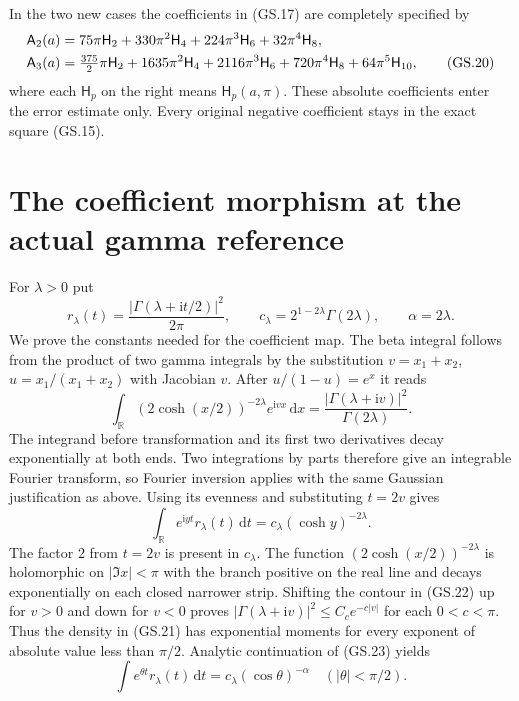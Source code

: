 \documentclass[11pt]{article}
\newcommand{\ii}{\mathrm i}
\newcommand{\dd}{\,\mathrm d}
\begin{document}
In the two new cases the coefficients in (GS.17) are completely
specified by
\begin{align}
 \mathsf A_2(a)
 &=75\pi\mathsf H_2+330\pi^2\mathsf H_4
   +224\pi^3\mathsf H_6+32\pi^4\mathsf H_8,\notag\\
 \mathsf A_3(a)
 &=\tfrac{375}{2}\pi\mathsf H_2+1635\pi^2\mathsf H_4
   +2116\pi^3\mathsf H_6+720\pi^4\mathsf H_8
   +64\pi^5\mathsf H_{10},\tag{GS.20}
\end{align}
where each $\mathsf H_p$ on the right means $\mathsf H_p(a,\pi)$.
These absolute coefficients enter the error estimate only. Every
original negative coefficient stays in the exact square (GS.15).

\section{The coefficient morphism at the actual gamma reference}

For $\lambda>0$ put
\begin{equation}
 r_\lambda(t)=\frac{|\Gamma(\lambda+\ii t/2)|^2}{2\pi},\qquad
 c_\lambda=2^{1-2\lambda}\Gamma(2\lambda),\qquad
 \alpha=2\lambda.\tag{GS.21}
\end{equation}
We prove the constants needed for the coefficient map. The beta
integral follows from the product of two gamma integrals by the
substitution $v=x_1+x_2$, $u=x_1/(x_1+x_2)$ with Jacobian $v$.
After $u/(1-u)=e^x$ it reads
\begin{equation}
 \int_{\mathbb R}(2\cosh(x/2))^{-2\lambda}e^{\ii vx}\dd x
 =\frac{|\Gamma(\lambda+\ii v)|^2}{\Gamma(2\lambda)}.
 \tag{GS.22}
\end{equation}
The integrand before transformation and its first two derivatives
decay exponentially at both ends. Two integrations by parts therefore
give an integrable Fourier transform, so Fourier inversion applies
with the same Gaussian justification as above. Using its evenness
and substituting $t=2v$ gives
\begin{equation}
 \int_{\mathbb R}e^{\ii yt}r_\lambda(t)\dd t
 =c_\lambda(\cosh y)^{-2\lambda}.\tag{GS.23}
\end{equation}
The factor $2$ from $t=2v$ is present in $c_\lambda$.
The function $(2\cosh(x/2))^{-2\lambda}$ is holomorphic on
$|\Im x|<\pi$ with the branch positive on the real line and
decays exponentially on each closed narrower strip. Shifting the
contour in (GS.22) up for $v>0$ and down for $v<0$ proves
$|\Gamma(\lambda+\ii v)|^2\le C_c e^{-c|v|}$ for each
$0<c<\pi$. Thus the density in (GS.21) has exponential moments
for every exponent of absolute value less than $\pi/2$.
Analytic continuation of (GS.23) yields
\begin{equation}
 \int e^{\theta t}r_\lambda(t)\dd t
 =c_\lambda(\cos\theta)^{-\alpha}\quad(|\theta|<\pi/2).
 \tag{GS.24}
\end{equation}
\end{document}
